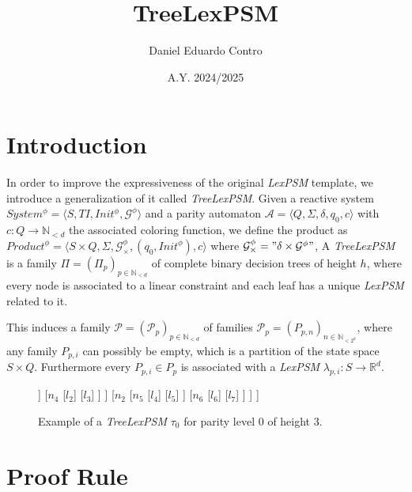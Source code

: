 \documentclass[a4paper,12pt, english]{article}
\author{Daniel Eduardo Contro}
\date{A.Y. 2024/2025}
\title{TreeLexPSM}
\begin{document}
\maketitle

\section{Introduction}

In order to improve the expressiveness of the original \textit{LexPSM} template, we introduce a
generalization of it called \textit{TreeLexPSM}.
Given a reactive system $System^\phi=\langle S, TI, Init^\phi, \mathcal{G}^\phi \rangle$ and a
parity automaton $\mathcal{A} = \langle Q, \Sigma, \delta, q_0, c \rangle$ with
$c : Q \rightarrow \mathbb{N}_{<d}$ the associated coloring function, we define the product
as $Product^\phi=\langle S \times Q, \Sigma, \mathcal{G}^\phi_\times, (q_0, Init^\phi), c \rangle$
where $\mathcal{G}^\phi_\times = "\delta \times \mathcal{G}^\phi"$,
A \textit{TreeLexPSM} is a family $\Pi = (\Pi_p)_{p \in \mathbb{N}_{<d}}$ of complete binary decision trees
of height $h$, where every node is associated to a linear constraint and each leaf has a unique
\textit{LexPSM} related to it.

This induces a family $\mathcal{P}=(\mathcal{P}_p)_{p \in \mathbb{N}_{<d}}$ of families
$\mathcal{P}_p=(P_{p,n})_{n \in \mathbb{N}_{<2^h}}$, where any family $P_{p,i}$ can possibly be empty,
which is a partition of the state space $S \times Q$.
Furthermore every $P_{p,i} \in P_p$ is associated with a
\textit{LexPSM} $\lambda_{p,i} : S \to \mathbb{R}^d$.

\begin{figure}[h!]
	\begin{center}
		\begin{forest}
			[$n_0$
				[$n_1$ [$n_3$ [$l_0$] [$l_1$] ] [$n_4$ [$l_2$] [$l_3$] ] ]
					[$n_2$ [$n_5$ [$l_4$] [$l_5$] ] [$n_6$ [$l_6$] [$l_7$] ] ]
			]
		\end{forest}
		\caption{Example of a \textit{TreeLexPSM} $\tau_0$ for parity level 0 of height 3.}
	\end{center}
\end{figure}

\section{Proof Rule}
\end{document}
